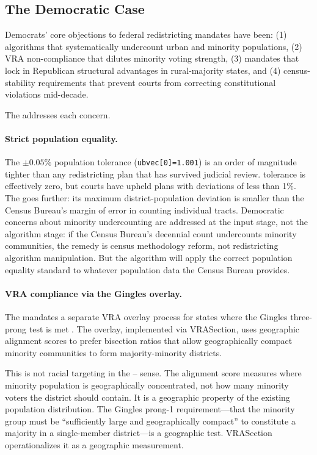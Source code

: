 \subsection{The Democratic Case}

Democrats' core objections to federal redistricting mandates have been:
(1) algorithms that systematically undercount urban and minority populations,
(2) VRA non-compliance that dilutes minority voting strength, (3) mandates
that lock in Republican structural advantages in rural-majority states,
and (4) census-stability requirements that prevent courts from correcting
constitutional violations mid-decade.

The \dia{} addresses each concern.

\paragraph{Strict population equality.}
The $\pm 0.05\%$ population tolerance (\texttt{ubvec[0]=1.001}) is an
order of magnitude tighter than any redistricting plan that has survived
judicial review.
\karcher{} tolerance is effectively zero, but courts have upheld plans
with deviations of less than 1\%.
The \dia{} goes further: its maximum district-population deviation is
smaller than the Census Bureau's margin of error in counting individual tracts.
Democratic concerns about minority undercounting are addressed at the
input stage, not the algorithm stage: if the Census Bureau's decennial count
undercounts minority communities, the remedy is census methodology reform,
not redistricting algorithm manipulation.
But the algorithm will apply the correct population equality standard to
whatever population data the Census Bureau provides.

\paragraph{VRA compliance via the Gingles overlay.}
The \dia{} mandates a separate VRA overlay process for states where the
Gingles three-prong test is met \citep{b14paper}.
The overlay, implemented via VRASection, uses geographic alignment scores
to prefer bisection ratios that allow geographically compact minority
communities to form majority-minority districts.

This is not racial targeting in the \shaw{}--\miller{} sense.
The alignment score measures where minority population is geographically
concentrated, not how many minority voters the district should contain.
It is a geographic property of the existing population distribution.
The Gingles prong-1 requirement---that the minority group must be
``sufficiently large and geographically compact'' to constitute a majority
in a single-member district---is a geographic test.
VRASection operationalizes it as a geographic measurement.

